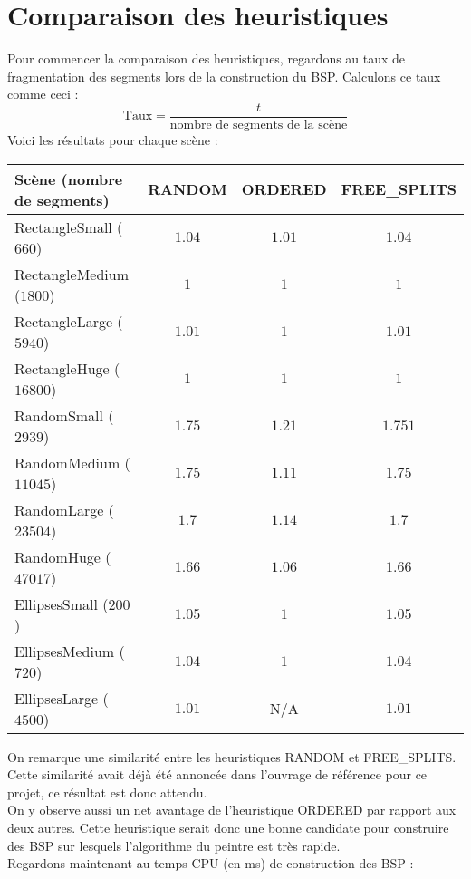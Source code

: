 \documentclass[11pts]{article}
\begin{document}
\newpage
\section{Comparaison des heuristiques}
Pour commencer la comparaison des heuristiques, regardons au taux de fragmentation des segments lors de la construction du BSP. Calculons ce taux comme ceci :\\
\[ \text{Taux} = \frac{t}{\text{nombre de segments de la scène}}\]
Voici les résultats pour chaque scène :
\begin{longtable}{|l|c|c|c|}
\hline
\textbf{Scène (nombre de segments)} & \textbf{RANDOM} & \textbf{ORDERED} & \textbf{FREE\_SPLITS}\\
\hline
RectangleSmall ($660$)&$1.04$&$1.01$&$1.04$\\
\hline
RectangleMedium ($1800$)&$1$&$1$&$1$\\
\hline
RectangleLarge ($5940$)&$1.01$&$1$&$1.01$\\
\hline
RectangleHuge ($16800$)&$1$&$1$&$1$\\
\hline
RandomSmall ($2939$)&$1.75$&$1.21$&$1.751$\\
\hline
RandomMedium ($11045$)&$1.75$&$1.11$&$1.75$\\
\hline
RandomLarge ($23504$)&$1.7$&$1.14$&$1.7$\\
\hline
RandomHuge ($47017$)&$1.66$&$1.06$&$1.66$\\
\hline
EllipsesSmall ($200$)&$1.05$&$1$&$1.05$\\
\hline
EllipsesMedium ($720$)&$1.04$&$1$&$1.04$\\
\hline
EllipsesLarge ($4500$)&$1.01$&N/A&$1.01$\\
\hline
\end{longtable}
\noindent On remarque une similarité entre les heuristiques RANDOM et FREE\_SPLITS. Cette similarité avait déjà été annoncée dans l'ouvrage de référence pour ce projet, ce résultat est donc attendu.\\
On y observe aussi un net avantage de l'heuristique ORDERED par rapport aux deux autres. Cette heuristique serait donc une bonne candidate pour construire des BSP sur lesquels l'algorithme du peintre est très rapide.\\[0.5cm]
Regardons maintenant au temps CPU (en ms) de construction des BSP :
\end{document}
